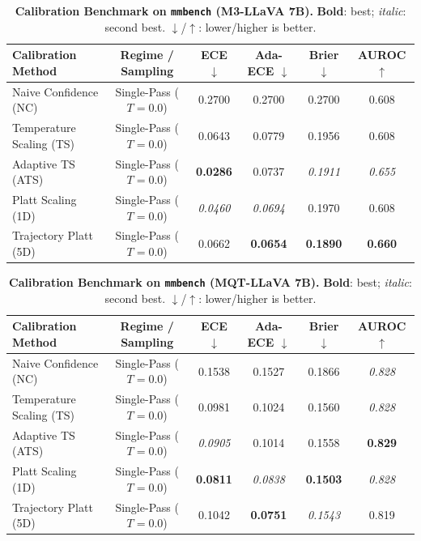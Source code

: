\begin{table}[t]
\setlength{\tabcolsep}{4pt}
\renewcommand{\arraystretch}{1.05}
\centering
\footnotesize
\begin{tabular}{lccccc}
\toprule
\textbf{Calibration Method} & \textbf{Regime / Sampling} & \textbf{ECE} $\downarrow$ & \textbf{Ada-ECE} $\downarrow$ & \textbf{Brier} $\downarrow$ & \textbf{AUROC} $\uparrow$ \\
\midrule
Naive Confidence (NC) & Single-Pass ($T = 0.0$) & 0.2700 & 0.2700 & 0.2700 & 0.608 \\
Temperature Scaling (TS) & Single-Pass ($T = 0.0$) & 0.0643 & 0.0779 & 0.1956 & 0.608 \\
Adaptive TS (ATS) & Single-Pass ($T = 0.0$) & \textbf{0.0286} & 0.0737 & \textit{0.1911} & \textit{0.655} \\
Platt Scaling (1D) & Single-Pass ($T = 0.0$) & \textit{0.0460} & \textit{0.0694} & 0.1970 & 0.608 \\
Trajectory Platt (5D) & Single-Pass ($T = 0.0$) & 0.0662 & \textbf{0.0654} & \textbf{0.1890} & \textbf{0.660} \\
\bottomrule
\end{tabular}
\caption{\textbf{Calibration Benchmark on \texttt{mmbench} (M3-LLaVA 7B).} \textbf{Bold}: best; \textit{italic}: second best. $\downarrow$/$\uparrow$: lower/higher is better.}
\label{tab:benchmark_m3_mmbench}
\end{table}

\begin{table}[t]
\setlength{\tabcolsep}{4pt}
\renewcommand{\arraystretch}{1.05}
\centering
\footnotesize
\begin{tabular}{lccccc}
\toprule
\textbf{Calibration Method} & \textbf{Regime / Sampling} & \textbf{ECE} $\downarrow$ & \textbf{Ada-ECE} $\downarrow$ & \textbf{Brier} $\downarrow$ & \textbf{AUROC} $\uparrow$ \\
\midrule
Naive Confidence (NC) & Single-Pass ($T = 0.0$) & 0.1538 & 0.1527 & 0.1866 & \textit{0.828} \\
Temperature Scaling (TS) & Single-Pass ($T = 0.0$) & 0.0981 & 0.1024 & 0.1560 & \textit{0.828} \\
Adaptive TS (ATS) & Single-Pass ($T = 0.0$) & \textit{0.0905} & 0.1014 & 0.1558 & \textbf{0.829} \\
Platt Scaling (1D) & Single-Pass ($T = 0.0$) & \textbf{0.0811} & \textit{0.0838} & \textbf{0.1503} & \textit{0.828} \\
Trajectory Platt (5D) & Single-Pass ($T = 0.0$) & 0.1042 & \textbf{0.0751} & \textit{0.1543} & 0.819 \\
\bottomrule
\end{tabular}
\caption{\textbf{Calibration Benchmark on \texttt{mmbench} (MQT-LLaVA 7B).} \textbf{Bold}: best; \textit{italic}: second best. $\downarrow$/$\uparrow$: lower/higher is better.}
\label{tab:benchmark_mqt_mmbench}
\end{table}
